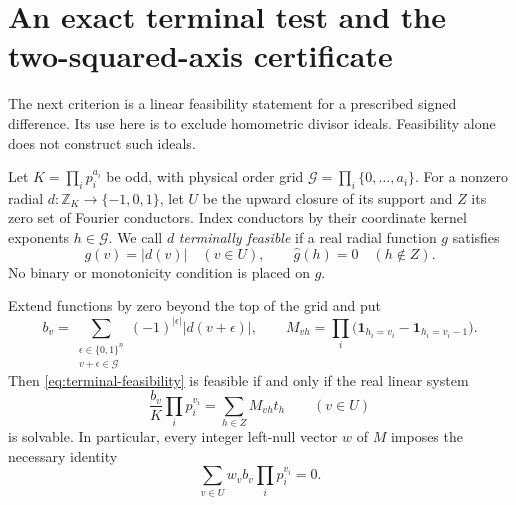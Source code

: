 \section{An exact terminal test and the two-squared-axis certificate}
\label{subsec:terminal-grid-certificate}

The next criterion is a linear feasibility statement for a prescribed
signed difference. Its use here is to exclude homometric divisor ideals.
Feasibility alone does not construct such ideals.

Let \(K=\prod_i p_i^{a_i}\) be odd, with physical order grid
\(\mathcal G=\prod_i\{0,\ldots,a_i\}\). For a nonzero radial
\(d:\mathbb Z_K\to\{-1,0,1\}\), let \(U\) be the upward closure
of its support and \(Z\) its zero set of Fourier conductors. Index
conductors by their coordinate kernel exponents \(h\in\mathcal G\).
We call \(d\) \emph{terminally feasible} if a real radial function
\(g\) satisfies
\begin{equation}
g(v)=|d(v)|\quad(v\in U),\qquad
\widehat g(h)=0\quad(h\notin Z).
\label{eq:terminal-feasibility}
\end{equation}
No binary or monotonicity condition is placed on \(g\).

\begin{lemma}
\label{lem:terminal-incidence}
Extend functions by zero beyond the top of the grid and put
\[
b_v=\sum_{\substack{\epsilon\in\{0,1\}^n\\v+\epsilon\in\mathcal G}}
       (-1)^{|\epsilon|}|d(v+\epsilon)|,
\qquad
M_{vh}=\prod_i\bigl(\mathbf1_{h_i=v_i}-\mathbf1_{h_i=v_i-1}\bigr).
\]
Then \eqref{eq:terminal-feasibility} is feasible if and only if the
real linear system
\begin{equation}
\frac{b_v}{K}\prod_i p_i^{v_i}
       =\sum_{h\in Z}M_{vh}t_h\qquad(v\in U)
\label{eq:terminal-incidence-system}
\end{equation}
is solvable. In particular, every integer left-null vector \(w\)
of \(M\) imposes the necessary identity
\[
\sum_{v\in U}w_vb_v\prod_i p_i^{v_i}=0.
\]
\end{lemma}

